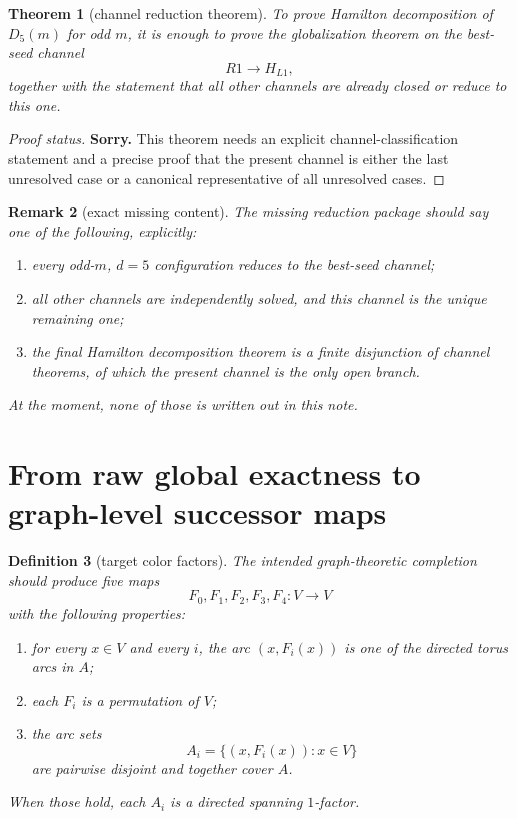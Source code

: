 \documentclass[11pt]{article}
\newtheorem{theorem}{Theorem}[section]
\newtheorem{definition}[theorem]{Definition}
\newtheorem{remark}[theorem]{Remark}
\begin{document}
\begin{theorem}[channel reduction theorem]
To prove Hamilton decomposition of $D_5(m)$ for odd $m$, it is enough to prove
the globalization theorem on the best-seed channel
\[
R1 \to H_{L1},
\]
together with the statement that all other channels are already closed or
reduce to this one.
\end{theorem}

\begin{proof}[Proof status]
\textbf{Sorry.} This theorem needs an explicit channel-classification statement
and a precise proof that the present channel is either the last unresolved case
or a canonical representative of all unresolved cases.
\end{proof}

\begin{remark}[exact missing content]
The missing reduction package should say one of the following, explicitly:
\begin{enumerate}[label=\textup{(\arabic*)},leftmargin=2.5em]
\item every odd-$m$, $d=5$ configuration reduces to the best-seed channel;
\item all other channels are independently solved, and this channel is the
      unique remaining one;
\item the final Hamilton decomposition theorem is a finite disjunction of
      channel theorems, of which the present channel is the only open branch.
\end{enumerate}
At the moment, none of those is written out in this note.
\end{remark}

\section{From raw global exactness to graph-level successor maps}

\begin{definition}[target color factors]
The intended graph-theoretic completion should produce five maps
\[
F_0,F_1,F_2,F_3,F_4 : V \to V
\]
with the following properties:
\begin{enumerate}[label=\textup{(\arabic*)},leftmargin=2.5em]
\item for every $x\in V$ and every $i$, the arc $(x,F_i(x))$ is one of the
      directed torus arcs in $A$;
\item each $F_i$ is a permutation of $V$;
\item the arc sets
      \[
      A_i=\{(x,F_i(x)):x\in V\}
      \]
      are pairwise disjoint and together cover $A$.
\end{enumerate}
When those hold, each $A_i$ is a directed spanning $1$-factor.
\end{definition}
\end{document}
